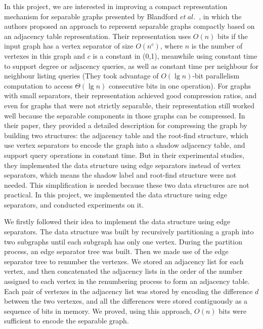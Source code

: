 \documentclass[12pt,glossary]{dalthesis}
\begin{document}
\bigskip


In this project, we are interested in improving a compact representation mechanism for separable graphs presented by Blandford $et \ al.$~\cite{compact-representation}, in which the authors proposed an approach to represent separable graphs compactly based on an adjacency table representation. Their representation uses $O(n)$ bits if the input graph has a vertex separator of size $O(n^{c})$, where $n$ is the number of vertexes in this graph and $c$ is a constant in (0,1), meanwhile using constant time to support degree or adjacency queries, as well as constant time per neighbour for neighbour listing queries (They took advantage of $O(\lg n)$-bit parallelism computation to access $\Theta(\lg n)$ consecutive bits in one operation). For graphs with small separators, their representation achieved good compression ratios, and even for graphs that were not strictly separable, their representation still worked well because the separable components in those graphs can be compressed. In their paper, they provided a detailed description for compressing the graph by building two structures: the adjacency table and the root-find structure, which use vertex separators to encode the graph into a shadow adjacency table, and support query operations in constant time. But in their experimental studies, they implemented the data structure using edge separators instead of vertex separators, which means the shadow label and root-find structure were not needed. This simplification is needed because these two data structures are not practical. In this project, we implemented the data structure using edge separators, and conducted experiments on it.

\bigskip
\bigskip

We firstly followed their idea to implement the data structure using edge separators. The data structure was built by recursively partitioning a graph into two subgraphs until each subgraph has only one vertex. During the partition process, an edge separator tree was built. Then we made use of the edge separator tree to renumber the vertexes. We stored an adjacency list for each vertex, and then concatenated the adjacency lists in the order of the number assigned to each vertex in the renumbering process to form an adjacency table. Each pair of vertexes in the adjacency list was stored by encoding the difference $d$ between the two vertexes, and all the differences were stored contiguously as a sequence of bits in memory. We proved, using this approach, $O(n)$ bits were sufficient to encode the separable graph. 
\end{document}
